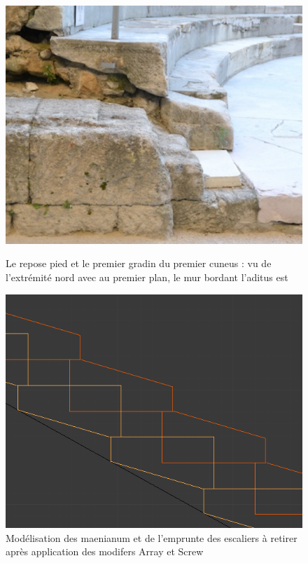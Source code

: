 \begin{figure}[!h] 
	\begin{subfigureth}{0.49\textwidth}
		\includegraphics[scale=0.3]{images/gradinCoupe}
		\caption[Repose pied et premier gradin du premier \gls{cuneus}]{Le repose pied et le premier gradin du premier \gls{cuneus} : vu de l'extrémité nord avec au premier plan, le mur bordant l'\gls{aditus} est} 
		\label{coupeGradin} 		
	\end{subfigureth}	
	\begin{subfigureth}{0.49\textwidth}
		\includegraphics[scale=0.3]{images/escaliers}
		\caption[Modélisation des \gls{maenianum}]{Modélisation des \gls{maenianum} et de l'emprunte des escaliers à retirer après application des modifers Array et Screw}
		\label{modelMaenianum} 		
	\end{subfigureth}	
\end{figure}


